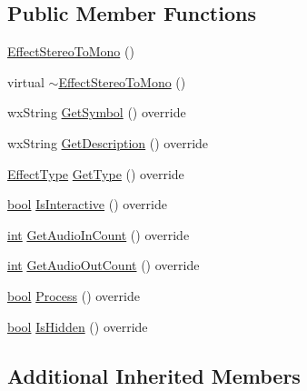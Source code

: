 \subsection*{Public Member Functions}
\begin{DoxyCompactItemize}
\item 
\hyperlink{class_effect_stereo_to_mono_adaf12806cc03f5a50efa617defe1b964}{Effect\+Stereo\+To\+Mono} ()
\item 
virtual \hyperlink{class_effect_stereo_to_mono_af9674da2dbf1b809ab2ae42be960db99}{$\sim$\+Effect\+Stereo\+To\+Mono} ()
\item 
wx\+String \hyperlink{class_effect_stereo_to_mono_a81df63da07236962f206f12071df1a0d}{Get\+Symbol} () override
\item 
wx\+String \hyperlink{class_effect_stereo_to_mono_a7a426650d45adcc86b89540ce28690f3}{Get\+Description} () override
\item 
\hyperlink{_effect_interface_8h_a4809a7bb3fd1a421902a667cc1405d43}{Effect\+Type} \hyperlink{class_effect_stereo_to_mono_a184f2730ae40704faa4d759b24e3183d}{Get\+Type} () override
\item 
\hyperlink{mac_2config_2i386_2lib-src_2libsoxr_2soxr-config_8h_abb452686968e48b67397da5f97445f5b}{bool} \hyperlink{class_effect_stereo_to_mono_a622e5c03638b6df886ad197c124c7c0d}{Is\+Interactive} () override
\item 
\hyperlink{xmltok_8h_a5a0d4a5641ce434f1d23533f2b2e6653}{int} \hyperlink{class_effect_stereo_to_mono_a50a7cb4a08888683e7afa52bb49664a1}{Get\+Audio\+In\+Count} () override
\item 
\hyperlink{xmltok_8h_a5a0d4a5641ce434f1d23533f2b2e6653}{int} \hyperlink{class_effect_stereo_to_mono_a9a09dc9ab4e9636045a9a794e0ebf4b5}{Get\+Audio\+Out\+Count} () override
\item 
\hyperlink{mac_2config_2i386_2lib-src_2libsoxr_2soxr-config_8h_abb452686968e48b67397da5f97445f5b}{bool} \hyperlink{class_effect_stereo_to_mono_add87630595a7c6a776f5062bb97974c9}{Process} () override
\item 
\hyperlink{mac_2config_2i386_2lib-src_2libsoxr_2soxr-config_8h_abb452686968e48b67397da5f97445f5b}{bool} \hyperlink{class_effect_stereo_to_mono_ae2b586875806d767c03b345d19be1fa2}{Is\+Hidden} () override
\end{DoxyCompactItemize}
\subsection*{Additional Inherited Members}


